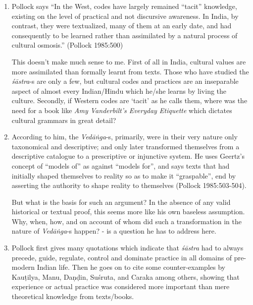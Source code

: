 \begin{enumerate}
\item Pollock says ``In the West, codes have largely remained ``tacit'' knowledge, existing on the level of practical and not discursive awareness. In India, by contrast, they were textualized, many of them at an early date, and had consequently to be learned rather than assimilated by a natural process of cultural osmosis.''  (Pollock 1985:500) 

\newpage

This doesn't make much sense to me. First of all in India, cultural values are more assimilated than formally learnt from texts. Those who have studied the {\it śāstra}-s are only a few, but cultural codes and practices are an inseparable aspect of almost every Indian/Hindu which he/she learns by living the culture.  Secondly, if Western codes are `tacit' as he calls them, where was the need for a book like \textsl{Amy Vanderbilt's Everyday Etiquette}  which dictates cultural grammars in great detail?

\item According to him, the {\it Vedāṅga}-s,  primarily, were in their very nature only taxonomical and descriptive; and only later transformed themselves from a descriptive catalogue to a prescriptive or injunctive system. He uses Geertz's concept of ``models of'' as against ``models for'', and says texts that had initially shaped themselves to reality so as to make it ``graspable'', end by asserting the authority to shape reality to themselves (Pollock 1985:503-504). 

But what is the basis for such an argument? In the absence of any valid historical or textual proof, this seems more like his own baseless assumption. Why, when, how, and on account of whom did such a transformation in the nature of {\it Vedāṅga}-s happen? - is a question he has to address here.

\item Pollock first gives many quotations which indicate that {\it śāstra} had to always precede, guide, regulate, control and dominate practice in all domains of pre-modern Indian life. Then he goes on to cite some counter-examples by Kauṭilya, Manu, Daṇḍin, Suśruta, and Caraka among others, showing that experience or actual practice was considered more important than mere theoretical knowledge from texts/books. 


\end{enumerate}
